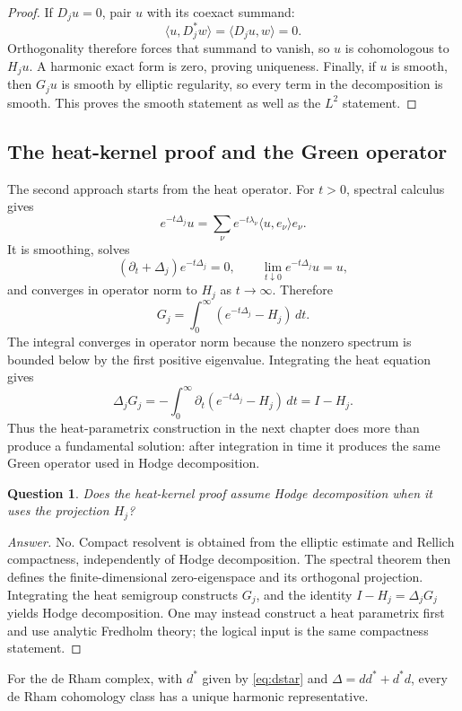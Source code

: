 \documentclass[11pt,oneside,reqno]{book}
\theoremstyle{plain}
\newtheorem{question}[theorem]{Question}
\theoremstyle{definition}
\theoremstyle{remark}
\newenvironment{answer}{\begin{proof}[Answer]}{\end{proof}}
\begin{document}
\begin{proof}
If \(D_ju=0\), pair \(u\) with its coexact summand:
\[
 \langle u,D_j^*w\rangle=\langle D_ju,w\rangle=0.
\]
Orthogonality therefore forces that summand to vanish, so \(u\) is
cohomologous to \(H_ju\). A harmonic exact form is zero, proving
uniqueness.  Finally, if \(u\) is smooth, then \(G_ju\) is smooth by
elliptic regularity, so every term in the decomposition is smooth.  This
proves the smooth statement as well as the \(L^2\) statement.
\end{proof}

\subsection{The heat-kernel proof and the Green operator}

The second approach starts from the heat operator.  For \(t>0\), spectral calculus gives
\[
 e^{-t\Delta_j}u
 =\sum_\nu e^{-t\lambda_\nu}\langle u,e_\nu\rangle e_\nu.
\]
It is smoothing, solves
\[
 (\partial_t+\Delta_j)e^{-t\Delta_j}=0,
 \qquad
 \lim_{t\downarrow0}e^{-t\Delta_j}u=u,
\]
and converges in operator norm to \(H_j\) as \(t\to\infty\).  Therefore
\[
 G_j=\int_0^\infty(e^{-t\Delta_j}-H_j)\,dt.
\]
The integral converges in operator norm because the nonzero spectrum is
bounded below by the first positive eigenvalue.  Integrating the heat
equation gives
\[
 \Delta_jG_j
 =-\int_0^\infty\partial_t(e^{-t\Delta_j}-H_j)\,dt
 =I-H_j.
\]
Thus the heat-parametrix construction in the next chapter does more than
produce a fundamental solution: after integration in time it produces
the same Green operator used in Hodge decomposition.

\begin{question}
Does the heat-kernel proof assume Hodge decomposition when it uses the
projection \(H_j\)?
\end{question}

\begin{answer}
No.  Compact resolvent is obtained from the elliptic estimate and Rellich
compactness, independently of Hodge decomposition.  The spectral theorem
then defines the finite-dimensional zero-eigenspace and its orthogonal
projection.  Integrating the heat semigroup constructs \(G_j\), and the
identity \(I-H_j=\Delta_jG_j\) yields Hodge decomposition.  One may instead
construct a heat parametrix first and use analytic Fredholm theory; the
logical input is the same compactness statement.
\end{answer}

For the de Rham complex, with \(d^*\) given by \eqref{eq:dstar} and
\(\Delta=dd^*+d^*d\), every de Rham
cohomology class has a unique harmonic representative.
\end{document}

